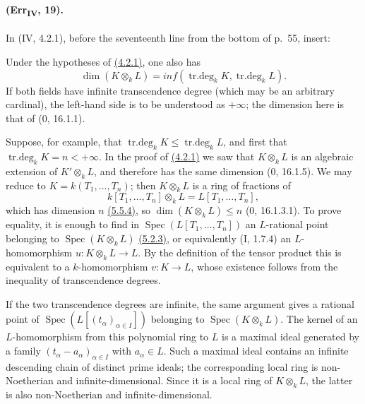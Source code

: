 \paragraph{(Err\textsubscript{IV}, 19).}
In (IV, 4.2.1), before the seventeenth line from the bottom of p.~55,
insert:

\begin{remark}[4.2.1.4]
\label{IV.4.2.1.4}
Under the hypotheses of {\hyperref[IV.4.2.1]{(4.2.1)}}, one also has
\begin{equation}
 \dim(K\otimes_kL)=inf(\operatorname{tr.deg}_kK,
                           \operatorname{tr.deg}_kL). \label{IV.4.2.1.5}
\tag{4.2.1.5}
\end{equation}
If both fields have infinite transcendence degree (which may be an
arbitrary cardinal), the left-hand side is to be understood as
$+\infty$; the dimension here is that of ($0$, 16.1.1).

Suppose, for example, that
$\operatorname{tr.deg}_kK\leq\operatorname{tr.deg}_kL$, and first that
$\operatorname{tr.deg}_kK=n<+\infty$.  In the proof of {\hyperref[IV.4.2.1]{(4.2.1)}} we saw
that $K\otimes_kL$ is an algebraic extension of $K'\otimes_kL$, and
therefore has the same dimension ($0$, 16.1.5).  We may reduce to
$K=k(T_1,\ldots,T_n)$; then $K\otimes_kL$ is a ring of fractions of
\[
 k[T_1,\ldots,T_n]\otimes_kL=L[T_1,\ldots,T_n],
\]
which has dimension $n$ {\hyperref[IV.5.5.4]{(5.5.4)}}, so
$\dim(K\otimes_kL)\leq n$ ($0$, 16.1.3.1).  To prove equality, it is
enough to find in $\operatorname{Spec}(L[T_1,\ldots,T_n])$ an
$L$-rational point belonging to $\operatorname{Spec}(K\otimes_kL)$
{\hyperref[IV.5.2.3]{(5.2.3)}}, or equivalently (I, 1.7.4) an $L$-homomorphism
$u:K\otimes_kL\to L$.  By the definition of the tensor product this is
equivalent to a $k$-homomorphism $v:K\to L$, whose existence follows
from the inequality of transcendence degrees.

If the two transcendence degrees are infinite, the same argument gives
a rational point of $\operatorname{Spec}(L[(t_\alpha)_{\alpha\in I}])$
belonging to $\operatorname{Spec}(K\otimes_kL)$.  The kernel of an
$L$-homomorphism from this polynomial ring to $L$ is a maximal ideal
generated by a family $(t_\alpha-a_\alpha)_{\alpha\in I}$ with
$a_\alpha\in L$.  Such a maximal ideal contains an infinite descending
chain of distinct prime ideals; the corresponding local ring is
non-Noetherian and infinite-dimensional.  Since it is a local ring of
$K\otimes_kL$, the latter is also non-Noetherian and
infinite-dimensional.
\end{remark}

